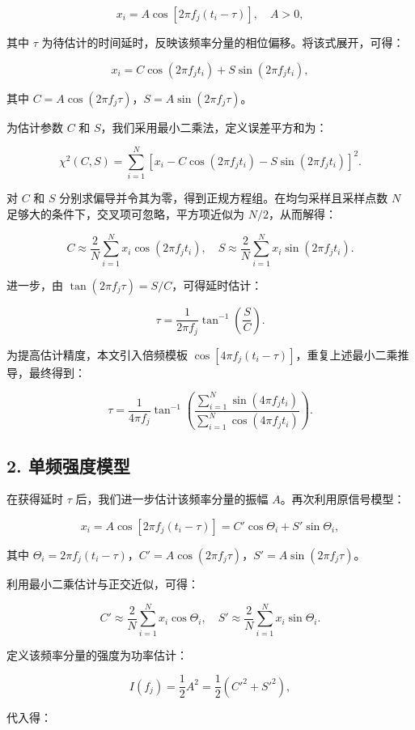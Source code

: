 \documentclass[withoutpreface,bwprint]{cumcmthesis}
\begin{document}
\[
x_i = A \cos[2\pi f_j(t_i - \tau)], \quad A > 0,
\]

其中 $\tau$ 为待估计的时间延时，反映该频率分量的相位偏移。将该式展开，可得：

\[
x_i = C \cos(2\pi f_j t_i) + S \sin(2\pi f_j t_i),
\]

其中 $C = A \cos(2\pi f_j \tau)$，$S = A \sin(2\pi f_j \tau)$。

为估计参数 $C$ 和 $S$，我们采用最小二乘法，定义误差平方和为：

\[
\chi^2(C, S) = \sum_{i=1}^{N} \left[x_i - C \cos(2\pi f_j t_i) - S \sin(2\pi f_j t_i)\right]^2.
\]

对 $C$ 和 $S$ 分别求偏导并令其为零，得到正规方程组。在均匀采样且采样点数 $N$ 足够大的条件下，交叉项可忽略，平方项近似为 $N/2$，从而解得：

\[
C \approx \frac{2}{N} \sum_{i=1}^{N} x_i \cos(2\pi f_j t_i), \quad
S \approx \frac{2}{N} \sum_{i=1}^{N} x_i \sin(2\pi f_j t_i).
\]

进一步，由 $\tan(2\pi f_j \tau) = S / C$，可得延时估计：

\[
\tau = \frac{1}{2\pi f_j} \tan^{-1}\left( \frac{S}{C} \right).
\]

为提高估计精度，本文引入倍频模板 $\cos[4\pi f_j(t_i - \tau)]$，重复上述最小二乘推导，最终得到：

\[
\tau = \frac{1}{4\pi f_j} \tan^{-1}\left( \frac{\sum_{i=1}^{N} \sin(4\pi f_j t_i)}{\sum_{i=1}^{N} \cos(4\pi f_j t_i)} \right).
\]

\subsection*{2. 单频强度模型}

在获得延时 $\tau$ 后，我们进一步估计该频率分量的振幅 $A$。再次利用原信号模型：

\[
x_i = A \cos[2\pi f_j(t_i - \tau)] = C' \cos\Theta_i + S' \sin\Theta_i,
\]

其中 $\Theta_i = 2\pi f_j(t_i - \tau)$，$C' = A \cos(2\pi f_j \tau)$，$S' = A \sin(2\pi f_j \tau)$。

利用最小二乘估计与正交近似，可得：

\[
C' \approx \frac{2}{N} \sum_{i=1}^{N} x_i \cos\Theta_i, \quad
S' \approx \frac{2}{N} \sum_{i=1}^{N} x_i \sin\Theta_i.
\]

定义该频率分量的强度为功率估计：

\[
I(f_j) = \frac{1}{2} A^2 = \frac{1}{2}(C'^2 + S'^2),
\]

代入得：
\end{document}
